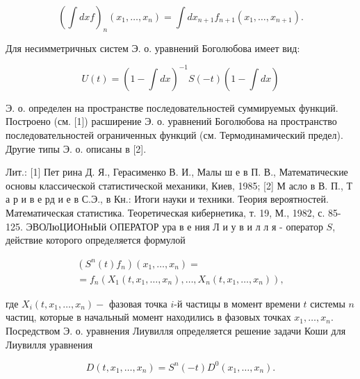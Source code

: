 \documentclass[10pt]{article}
\begin{document}
\[

\left(\int d x f\right)_{n}\left(x_{1}, \ldots, x_{n}\right)=\int d x_{n+1} f_{n+1}\left(x_{1}, \ldots, x_{n+1}\right) .

\]



Для несимметричных систем Э. о. уравнений Боголюбова имеет вид:



\[

U(t)=\left(1-\int d x\right)^{-1} S(-t)\left(1-\int d x\right)

\]



Э. о. определен на пространстве последовательностей суммируемых функций. Построено (см. [1]) расширение Э. о. уравнений Боголюбова на пространство последовательностей ограниченных функций (см. Термодинамический предел). Другие типы Э. о. описаны в [2].



Лит.: [1] Пет рина Д. Я., Герасименко В. И., Малы ш е в П. В., Математические основы классической статистической механики, Киев, 1985; [2] М асло в В. П., Т а р и в е рд и е в С.Э., в Кн.: Итоги науки и техники. Теория вероятностей. Математическая статистика. Теоретическая кибернетика, т. 19, М., 1982, с. 85-125. ЭВОЛюЦИОНнЫй OПЕРАТОР ура в е ния Л и у в и л л я - оператор $S$, действие которого определяется формулой



\[

\begin{gathered}

\left(S^{n}(t) f_{n}\right)\left(x_{1}, \ldots, x_{n}\right)= \\

=f_{n}\left(X_{1}\left(t, x_{1}, \ldots, x_{n}\right), \ldots, X_{n}\left(t, x_{1}, \ldots, x_{n}\right)\right),

\end{gathered}

\]



где $X_{i}\left(t, x_{1}, \ldots, x_{n}\right)-$ фазовая точка $i$-й частицы в момент времени $t$ системы $n$ частиц, которые в начальный момент находились в фазовых точках $x_{1}, \ldots, x_{n}$. Посредством Э. о. уравнения Лиувилля определяется решение задачи Коши для Лиувилля уравнения



\[

D\left(t, x_{1}, \ldots, x_{n}\right)=S^{n}(-t) D^{0}\left(x_{1}, \ldots, x_{n}\right) .

\]
\end{document}
